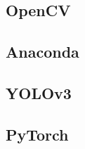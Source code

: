 \subsection{OpenCV}
\label{sec:OpenCV}

\subsection{Anaconda}
\label{sec:Anaconda}

\subsection{YOLOv3}
\label{sec:YOLOv3}

\subsection{PyTorch}
\label{sec:PyTorch}


